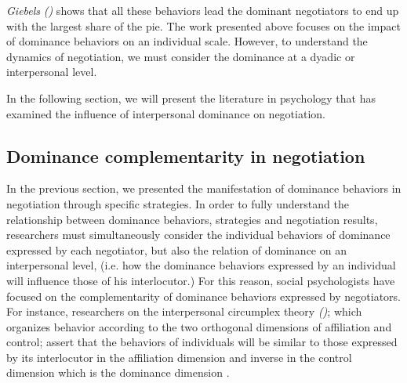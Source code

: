 \documentclass[10pt, a4paper]{article} %
\begin{document}
			\emph{Giebels} \emph{(\cite{giebels2000interdependence})} shows that all these behaviors lead the dominant negotiators to end up with the largest share of the pie.
			The work presented above focuses on the impact of dominance behaviors on an individual scale. However, to understand the dynamics of negotiation, we must consider the dominance at a dyadic or interpersonal level. 
			
			In the following section, we will present the literature in psychology that has examined the influence of interpersonal dominance on negotiation. 

		\subsection{Dominance complementarity in negotiation}
			 In the previous section, we presented the manifestation of dominance behaviors in negotiation through specific strategies.
			 In order to fully understand the relationship between dominance behaviors, strategies and negotiation results, researchers must simultaneously consider the individual behaviors of dominance expressed by each negotiator, but also the relation of dominance on an interpersonal level, (i.e. how the dominance behaviors expressed by an individual will influence those of his interlocutor.)
				For this reason, social psychologists have focused on the complementarity of dominance behaviors expressed by negotiators. For instance, researchers on the interpersonal circumplex theory \emph{(\cites{wiggins1979psychological, kiesler19831982})}; which organizes behavior according to the two orthogonal dimensions of affiliation and control; assert that the behaviors of individuals will be similar to those expressed by its interlocutor in the affiliation dimension and inverse in the control dimension which is the dominance dimension \cite{tiedens2003power}.
				
\end{document}
